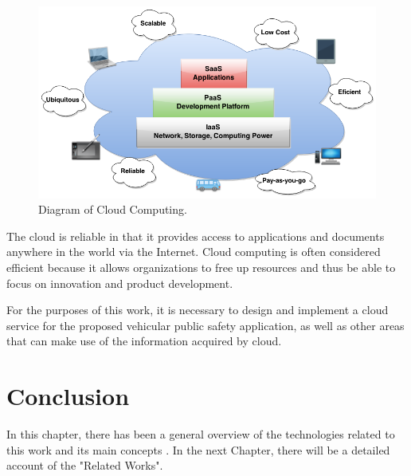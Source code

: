 \begin{figure}[htb!]
  \centering
    \includegraphics[scale=0.50]{Imagens/cap2_cloudremark.png}
    \caption{Diagram of Cloud Computing.}
    \label{fig:smart}
\end{figure}

The cloud is reliable in that it provides access to applications and documents anywhere in the world via the Internet. Cloud computing is often considered efficient because it allows organizations to free up resources and thus be able to focus on innovation and product development. 

For the purposes of this work, it is necessary to design and implement a cloud service for the proposed vehicular public safety application, as well as other areas that can make use of the information acquired by cloud. 

\section{Conclusion}

In this chapter, there has been a general overview of the technologies related to this work and its main concepts . In the next Chapter, there will be a detailed account of the "Related Works".
